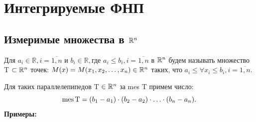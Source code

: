 \section{Интегрируемые ФНП}

\subsection{Измеримые множества в $\mathbb{R}^n$}
Для $a_i \in \mathbb{R}, i = \overline{1,n}$ и $b_i \in \mathbb{R}, \text{где } a_i \leqslant b_i, i = \overline{1,n}$  в $\mathbb{R}^n$ будем называть множество T $\subset \mathbb{R}^n$ точек: $M(x) = M(x_1, x_2, \ldots, x_n) \in \mathbb{R}^n$ таких, что $a_i \leqslant \forall x_i \leqslant b_i, i = \overline{1,n}$.

Для таких параллелепипедов T $\in \mathbb{R}^n$ за  mes T примем число:
\begin{equation}
	\label{611}
	\operatorname{mes} \text{T} = (b_1 - a_1) \cdot (b_2 - a_2) \cdot \ldots \cdot (b_n - a_n).
\end{equation}
\textbf{Примеры: } \\
